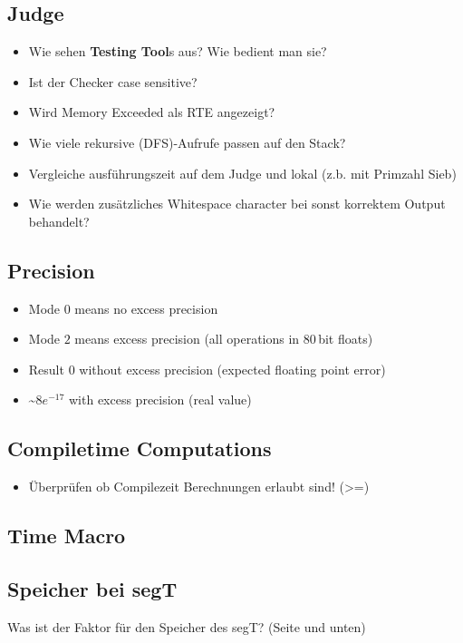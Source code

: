 \subsection{Judge}
\begin{itemize}
	\item Wie sehen \textbf{Testing Tool}s aus? Wie bedient man sie?
	\item Ist der Checker case sensitive?
	\item Wird Memory Exceeded als RTE angezeigt?
	\item Wie viele rekursive (DFS)-Aufrufe passen auf den Stack?
	\item Vergleiche ausführungszeit auf dem Judge und lokal (z.b. mit Primzahl Sieb)
	\item Wie werden zusätzliches Whitespace character bei sonst korrektem Output behandelt?
\end{itemize}

\subsection{Precision}
\begin{itemize}
	\item Mode $0$ means no excess precision
	\item Mode $2$ means excess precision (all operations in $80$\,bit floats)
\end{itemize}
\begin{itemize}
	\item Result $0$ without excess precision (expected floating point error)
	\item \textasciitilde$8e^{-17}$ with excess precision (real value)
\end{itemize}

\subsection{Compiletime Computations}
\begin{itemize}
	\item Überprüfen ob Compilezeit Berechnungen erlaubt sind! (>=)
\end{itemize}

\columnbreak
\subsection{Time Macro}


\subsection{Speicher bei segT}
Was ist der Faktor für den Speicher des segT? (Seite \pageref{segT} und unten)
